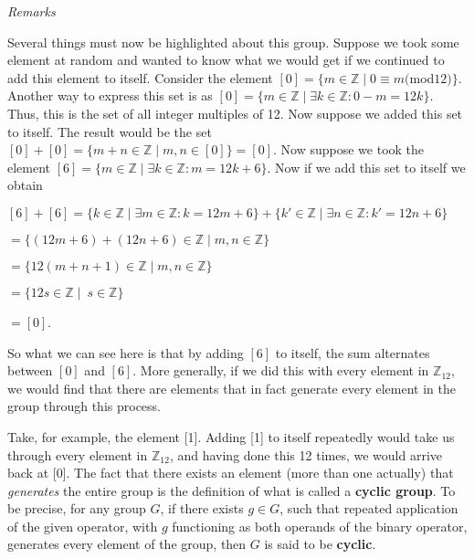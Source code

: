 \documentclass[12pt, a4paper]{article}
\begin{document}
\newpage

\begin{flushleft}

    \large{\textit{Remarks}}

\end{flushleft}

    Several things must now be highlighted about this group. Suppose we took some element at random and wanted to know what we would get if we continued to add this element to itself. Consider the element $[0]=\{m\in\mathbb{Z}\mid 0\equiv m($mod$12)\}$. Another way to express this set is as $[0]=\{m\in\mathbb{Z}\mid\exists k\in\mathbb{Z}\colon 0-m=12k\}$. Thus, this is the set of all integer multiples of 12. Now suppose we added this set to itself. The result would be the set $[0]+[0]=\{m+n\in\mathbb{Z}\mid m,n\in[0]\}=[0]$. Now suppose we took the element $[6]=\{m\in\mathbb{Z}\mid\exists k\in\mathbb{Z}\colon m=12k+6\}$. Now if we add this set to itself we obtain\par
    
\vspace{4mm}

\centerline{$[6]+[6]=\{k\in\mathbb{Z}\mid\exists m\in\mathbb{Z}\colon k=12m+6\}+\{k'\in\mathbb{Z}\mid\exists n\in\mathbb{Z}\colon k'=12n+6\}$}
\vspace{2mm}
\centerline{$=\{(12m+6)+(12n+6)\in\mathbb{Z}\mid m,n\in\mathbb{Z}\}$}
\vspace{2mm}
\centerline{$=\{12(m+n+1)\in\mathbb{Z}\mid m,n\in\mathbb{Z}\}$}
\vspace{2mm}
\centerline{$=\{12s\in\mathbb{Z}\mid\ s\in\mathbb{Z}\}$}
\vspace{2mm}
\centerline{$=[0]$.}

\vspace{4mm}
    
    So what we can see here is that by adding $[6]$ to itself, the sum alternates between $[0]$ and $[6]$. More generally, if we did this with every element in $\mathbb{Z}_{12}$, we would find that there are elements that in fact generate every element in the group through this process.\par
    
    Take, for example, the element [1]. Adding [1] to itself repeatedly would take us through every element in $\mathbb{Z}_{12}$, and having done this 12 times, we would arrive back at [0]. The fact that there exists an element (more than one actually) that \textit{generates} the entire group is the definition of what is called a \textbf{cyclic group}. To be precise, for any group $G$, if there exists $g\in G$, such that repeated application of the given operator, with $g$ functioning as both operands of the binary operator, generates every element of the group, then $G$ is said to be \textbf{cyclic}.\par
    
\end{document}
